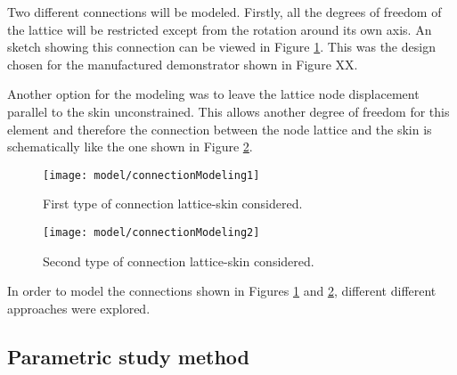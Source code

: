
Two different connections will be modeled. Firstly, all the degrees of freedom of the lattice will be restricted except from the rotation around its own axis. An sketch showing this connection can be viewed in Figure \ref{fig:connectionModeling1}. This was the design chosen for the manufactured demonstrator shown in Figure XX.

Another option for the modeling was to leave the lattice node displacement parallel to the skin unconstrained. This allows another degree of freedom for this element and therefore the connection between the node lattice and the skin is schematically like the one shown in Figure \ref{fig:connectionModeling2}.

\begin{figure}[!htpb]
  \centering
  \texttt{[image: model/connectionModeling1]}
  \caption[First type of connection lattice-skin considered]{First type of connection lattice-skin considered. }\label{fig:connectionModeling1}
\end{figure}

\begin{figure}[!htpb]
  \centering
  \texttt{[image: model/connectionModeling2]}
  \caption[Second type of connection lattice-skin considered]{Second type of connection lattice-skin considered. }\label{fig:connectionModeling2}
\end{figure}

In order to model the connections shown in Figures \ref{fig:connectionModeling1} and \ref{fig:connectionModeling2}, different different approaches were explored. 

\clearpage
\subsection{Parametric study method} \label{subsec:parametricStudy_computationalModel}